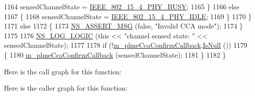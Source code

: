\begin{DoxyCode}
1164           sensedChannelState = \hyperlink{group__lr-wpan_gga6494269d13d45c511a07b7ccbb1de754a14641e5190b66ec8ec3903218058dc46}{IEEE\_802\_15\_4\_PHY\_BUSY};
1165         \}
1166       \textcolor{keywordflow}{else}
1167         \{
1168           sensedChannelState = \hyperlink{group__lr-wpan_gga6494269d13d45c511a07b7ccbb1de754af3994414efcd2fac7e312ecb9b3ebd70}{IEEE\_802\_15\_4\_PHY\_IDLE};
1169         \}
1170     \}
1171   \textcolor{keywordflow}{else}
1172     \{
1173       \hyperlink{assert_8h_aff5ece9066c74e681e74999856f08539}{NS\_ASSERT\_MSG} (\textcolor{keyword}{false}, \textcolor{stringliteral}{"Invalid CCA mode"});
1174     \}
1175 
1176   \hyperlink{group__logging_ga88acd260151caf2db9c0fc84997f45ce}{NS\_LOG\_LOGIC} (\textcolor{keyword}{this} << \textcolor{stringliteral}{"channel sensed state: "} << sensedChannelState);
1177 
1178   \textcolor{keywordflow}{if} (!\hyperlink{classns3_1_1LrWpanPhy_a3b75b533222419589c396380e8305bb9}{m\_plmeCcaConfirmCallback}.\hyperlink{classns3_1_1Callback_aa8e27826badbf37f84763f36f70d9b54}{IsNull} ())
1179     \{
1180       \hyperlink{classns3_1_1LrWpanPhy_a3b75b533222419589c396380e8305bb9}{m\_plmeCcaConfirmCallback} (sensedChannelState);
1181     \}
1182 \}
\end{DoxyCode}


Here is the call graph for this function\+:




Here is the caller graph for this function\+:


